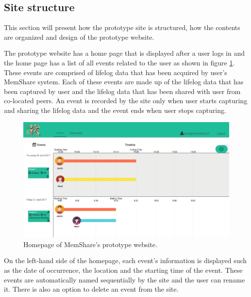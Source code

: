 \documentclass[mscthesis]{usiinfthesis}
\begin{document}
\subsection{Site structure}

This section will present how the prototype site is structured, how the contents are organized and design of the prototype website. 

The prototype website has a home page that is displayed after a user logs in and the home page has a list of all events related to the user as shown in figure \ref{fig5}. These events are comprised of lifelog data that has been acquired by user's MemShare system. Each of these events are made up of the lifelog data that has been captured by user and the lifelog data that has been shared with user from co-located peers. An event is recorded by the site only when user starts capturing and sharing the lifelog data and the event ends when user stops capturing.

\begin{figure}[!ht]
  \centering
  \includegraphics[width=1\textwidth]{Home}
  \caption{Homepage of MemShare's prototype website.}
  \label{fig5}
\end{figure}

On the left-hand side of the homepage, each event's information is displayed such as the date of occurrence, the location and the starting time of the event. These events are automatically named sequentially by the site and the user can rename it. There is also an option to delete an event from the site. 
\end{document}
